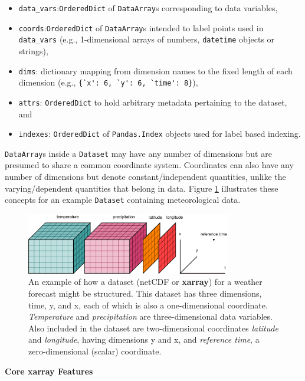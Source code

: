 \documentclass{jors}
\begin{document}
\begin{itemize}
	\item \verb|data_vars|:\verb|OrderedDict| of \verb|DataArray|s corresponding to data variables,
	\item \verb|coords|:\verb|OrderedDict| of \verb|DataArray|s intended to label points used in \verb|data_vars| (e.g., 1-dimensional arrays of numbers, \verb|datetime| objects or strings),
	\item \verb|dims|: dictionary mapping from dimension names to the fixed length of each dimension (e.g., \verb|{`x': 6, `y': 6, `time': 8}|),
	\item \verb|attrs|: \verb|OrderedDict| to hold arbitrary metadata pertaining to the dataset, and
	\item \verb|indexes|: \verb|OrderedDict| of \verb|Pandas.Index| objects used for label based indexing.
\end{itemize}

\verb|DataArray|s inside a \verb|Dataset| may have any number of dimensions but are presumed to share a common coordinate system.
Coordinates can also have any number of dimensions but denote constant/independent quantities, unlike the varying/dependent quantities that belong in data.
Figure \ref{fig:dataset_diagram} illustrates these concepts for an example \verb|Dataset| containing meteorological data.

\begin{figure}
	\centering
	\includegraphics[width=0.8\textwidth]{dataset-diagram_original}
	\caption{An example of how a dataset (netCDF or \textbf{xarray}) for a weather forecast might be structured. This dataset has three dimensions, time, y, and x, each of which is also a one-dimensional coordinate. \textit{Temperature} and \textit{precipitation} are three-dimensional data variables.  Also included in the dataset are two-dimensional coordinates \textit{latitude} and \textit{longitude}, having dimensions y and x, and \textit{reference time}, a zero-dimensional (scalar) coordinate.}
	\label{fig:dataset_diagram}
\end{figure}

\textbf{Core xarray Features}
\end{document}

